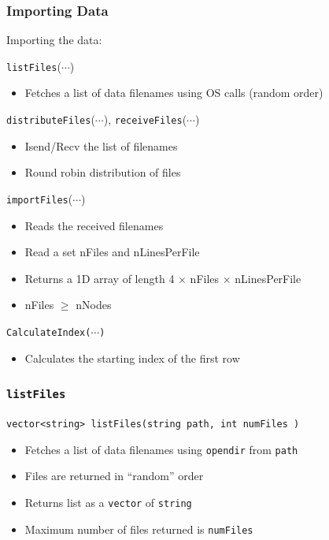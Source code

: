 \documentclass[usernames,dvipsnames]{beamer}
\begin{document}
\begin{frame}
	\frametitle{Importing Data}
	
    	\begin{block}{Importing the data:}
	    	
    		\texttt{listFiles}($\cdots$)
    		\begin{itemize}
    			\item Fetches a list of data filenames using OS calls (random order)
    		\end{itemize}
    		
    		\texttt{distributeFiles}($\cdots$), \texttt{receiveFiles}($\cdots$)
    		\begin{itemize}
    			\item Isend/Recv the list of filenames
    			\item Round robin distribution of files
    		\end{itemize}
    		
    		\texttt{importFiles}($\cdots$)
    		\begin{itemize}
    			\item Reads the received filenames
    			\item Read a set nFiles and nLinesPerFile
    			\item Returns a 1D array of length 4 $\times$ nFiles $\times$ nLinesPerFile
    			\item nFiles $\ge$ nNodes
    		\end{itemize}
    		
    		\texttt{CalculateIndex($\cdots$)}
    		    \begin{itemize}
    		        \item Calculates the starting index of the first row
    		    \end{itemize}
    	\end{block}
		
\end{frame}


\begin{frame}
	\frametitle{\texttt{listFiles}}
	
    		\texttt{vector<string> listFiles(string path, int numFiles )}
    		\begin{itemize}
    			\item Fetches a list of data filenames using \texttt{opendir} from \texttt{path}
    			\item Files are returned in ``random'' order
    			\item Returns list as a \texttt{vector} of \texttt{string}
    			\item Maximum number of files returned is \texttt{numFiles}
    		\end{itemize}
    		

\end{frame}
\end{document}
